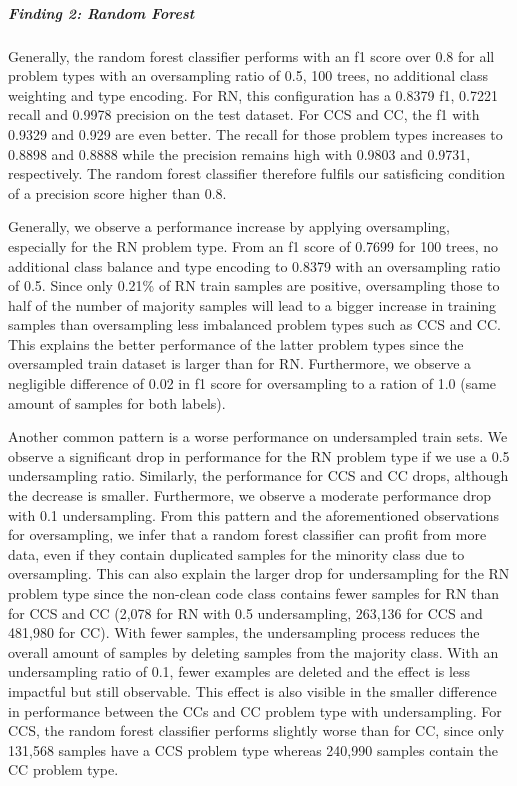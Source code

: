 \subparagraph{Finding 2: Random Forest}
Generally, the random forest classifier performs with an f1 score over 0.8 for all problem types with an oversampling ratio of 0.5, 100 trees, no additional class weighting and type encoding. For RN, this configuration has a 0.8379 f1, 0.7221 recall and 0.9978 precision on the test dataset. For CCS and CC, the f1 with 0.9329 and 0.929 are even better. The recall for those problem types increases to 0.8898 and 0.8888 while the precision remains high with 0.9803 and 0.9731, respectively. The random forest classifier therefore fulfils our satisficing condition of a precision score higher than 0.8.

Generally, we observe a performance increase by applying oversampling, especially for the RN problem type. From an f1 score of 0.7699 for 100 trees, no additional class balance and type encoding to 0.8379 with an oversampling ratio of 0.5. Since only 0.21\% of RN train samples are positive, oversampling those to half of the number of majority samples will lead to a bigger increase in training samples than oversampling less imbalanced problem types such as CCS and CC. This explains the better performance of the latter problem types since the oversampled train dataset is larger than for RN. Furthermore, we observe a negligible difference of 0.02 in f1 score for oversampling to a ration of 1.0 (same amount of samples for both labels).

Another common pattern is a worse performance on undersampled train sets. We observe a significant drop in performance for the RN problem type if we use a 0.5 undersampling ratio. Similarly, the performance for CCS and CC drops, although the decrease is smaller. Furthermore, we observe a moderate performance drop with 0.1 undersampling. From this pattern and the aforementioned observations for oversampling, we infer that a random forest classifier can profit from more data, even if they contain duplicated samples for the minority class due to oversampling. This can also explain the larger drop for undersampling for the RN problem type since the non-clean code class contains fewer samples for RN than for CCS and CC (2,078 for RN with 0.5 undersampling, 263,136 for CCS and 481,980 for CC). With fewer samples, the undersampling process reduces the overall amount of samples by deleting samples from the majority class. With an undersampling ratio of 0.1, fewer examples are deleted and the effect is less impactful but still observable. This effect is also visible in the smaller difference in performance between the CCs and CC problem type with undersampling. For CCS, the random forest classifier performs slightly worse than for CC, since only 131,568 samples have a CCS problem type whereas 240,990 samples contain the CC problem type.

